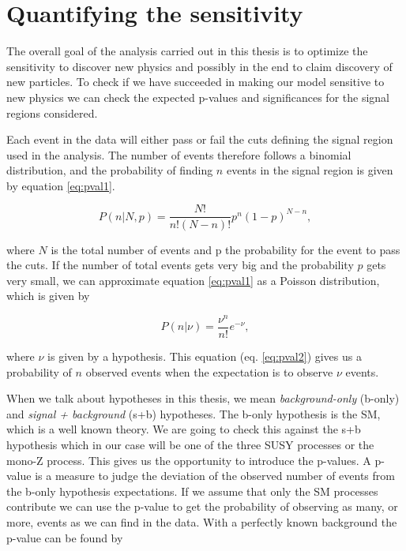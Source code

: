 \section{Quantifying the sensitivity}
\label{sec:significance}

The overall goal of the analysis carried out in this thesis is to optimize the sensitivity to discover new physics and possibly in the end to claim discovery of new particles. To check if we have succeeded in making our model sensitive to new physics we can check the expected p-values and significances for the signal regions considered. 

Each event in the data will either pass or fail the cuts defining the signal region used in the analysis. The number of events therefore follows a binomial distribution, and the probability of finding $n$ events in the signal region is given by equation \ref{eq:pval1}. 

\begin{equation}
    \label{eq:pval1}
    P(n|N, p) = \frac{N!}{n!(N-n)!} p^n(1-p)^{N-n},
\end{equation}

where $N$ is the total number of events and p the probability for the event to pass the cuts. If the number of total events gets very big and the probability $p$ gets very small, we can approximate equation \ref{eq:pval1} as a Poisson distribution, which is given by

\begin{equation}
    \label{eq:pval2}
    P(n|\nu) = \frac{\nu^n}{n!} e^{-\nu},
\end{equation}

where $\nu$ is given by a hypothesis. This equation (eq. \ref{eq:pval2}) gives us a probability of $n$ observed events when the expectation is to observe $\nu$ events. 

When we talk about hypotheses in this thesis, we mean \textit{background-only} (b-only) and \textit{signal + background} (s+b) hypotheses. The b-only hypothesis is the SM, which is a well known theory. We are going to check this against the s+b hypothesis which in our case will be one of the three SUSY processes or the mono-Z process. This gives us the opportunity to introduce the p-values. A p-value is a measure to judge the deviation of the observed number of events from the b-only hypothesis expectations. If we assume that only the SM processes contribute we can use the p-value to get the probability of observing as many, or more, events as we can find in the data. With a perfectly known background the p-value can be found by


